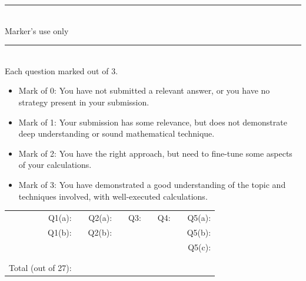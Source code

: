 \documentclass[a4paper, 11pt]{report}
\begin{document}
\hrule ${}^{}$ \\
Marker's use only
\\
\hrule ${}^{}$ \\
Each question marked out of 3.
\begin{itemize}
\item Mark of 0: You have not submitted a relevant answer, or you have no strategy present in your
submission.\\
\item Mark of 1: Your submission has some relevance, but does not demonstrate deep understanding or
sound mathematical technique. \\ 
\item Mark of 2: You have the right approach, but need to fine-tune some aspects of your
calculations.\\
\item Mark of 3: You have demonstrated a good understanding of the topic and techniques involved,
with well-executed calculations. \\ 
\end{itemize}
\begin{tabular}{rrrrrrrrr}
Q1(a): & \hspace{1cm} & Q2(a): & \hspace{1cm} & Q3: & \hspace{1cm} & Q4:  &\hspace{1cm} & Q5(a): \\[.5cm]
Q1(b): &              & Q2(b): &              &     &              &      &             & Q5(b): \\[.5cm]
       &              &        &              &     &              &      &             & Q5(c): \\[.5cm]
       &              &        &              &     &              &      &             &       \\[.5cm]
       &              &        &              &     &              &      &             &       \\
Total (out of 27): &&&&&&&& \\
\end{tabular}

\vfill
\newpage
\end{document}
